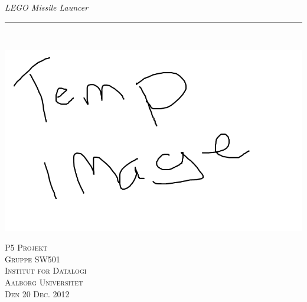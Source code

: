 \thispagestyle{empty}
\begin{flushright}
\vspace{3cm}

\phantom{hul}

\phantom{hul}

\phantom{hul}

\textsl{\Huge LEGO Missile Launcer} \\ \vspace{1cm}

\rule{13cm}{3mm} \\ \vspace{1.5cm}
\vspace{1cm}

\includegraphics[width=1.0\textwidth]{img/frontpage} 

\vspace{1.5cm} 
\textsc{\Large P5 Projekt \\
Gruppe SW501 \\
Institut for Datalogi\\
Aalborg Universitet\\
Den 20 Dec. 2012\\}
\end{flushright}

